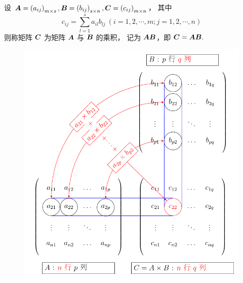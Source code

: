 \begin{definition}[矩阵乘法]
    设 $ \vb*{A}=\left(a_{i j}\right)_{m \times s}, \vb*{B}=\left(b_{i j}\right)_{s \times n}, \vb*{C}=\left(c_{i j}\right)_{m \times n} $，
    其中 $$c_{i j}=\sum_{l=1}^{s} a_{i l} b_{l j}~ (i=1,2, \cdots, m ; j=1,2, \cdots, n)$$
    则称矩阵 $ \vb*{C} $ 为矩阵 $ \vb*{A} $ 与 $ \vb*{B} $ 的乘积，
    记为 $ \vb*{AB} $，即 $ \vb*{C}=\vb*{AB} .$
\end{definition}

\begin{figure}[H]
    \centering
    \includegraphics[scale=0.75]{figures/matrix-multiplication.pdf}
    \caption{}
\end{figure}

